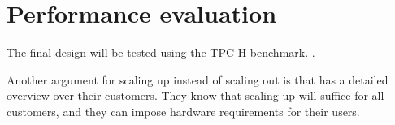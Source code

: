 \section{Performance evaluation}
\label{sec:Performance evaluation}
The final design will be tested using the TPC-H benchmark. .

Another argument for scaling up instead of scaling out is that \genus has a detailed overview over their customers. They know that scaling up will suffice for all customers, and they can impose hardware requirements for their users.
